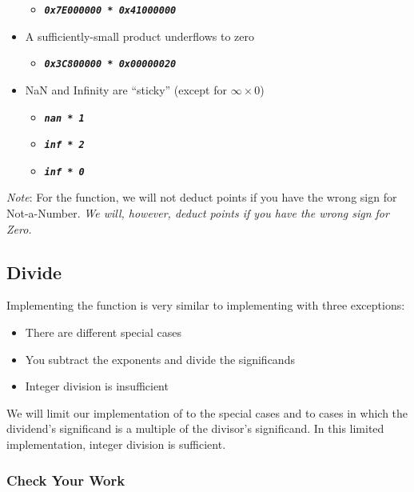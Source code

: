 \begin{itemize}
    \begin{itemize}
        \item[] \texttt{\textbf{\textit{0x7E000000 * 0x41000000}}}
    \end{itemize}
    \item A sufficiently-small product underflows to zero
    \begin{itemize}
        \item[] \texttt{\textbf{\textit{0x3C800000 * 0x00000020}}}
    \end{itemize}
    \item NaN and Infinity are ``sticky'' (except for $\infty \times 0$)
    \begin{itemize}
        \item[] \texttt{\textbf{\textit{nan * 1}}}
        \item[] \texttt{\textbf{\textit{inf * 2}}}
        \item[] \texttt{\textbf{\textit{inf * 0}}}
    \end{itemize}
\end{itemize}

\textit{Note}: For the  function, we will not deduct points if you have the wrong sign for Not-a-Number.
\textit{We will, however, deduct points if you have the wrong sign for Zero.}

\subsection{Divide}

Implementing the  function is very similar to implementing  with three exceptions:

\begin{itemize}
    \item There are different special cases
    \item You subtract the exponents and divide the significands
    \item Integer division is insufficient
\end{itemize}

We will limit our implementation of  to the special cases and to cases in which the dividend's significand is a multiple of the divisor's significand.
In this limited implementation, integer division is sufficient.

\subsubsection*{Check Your Work}

